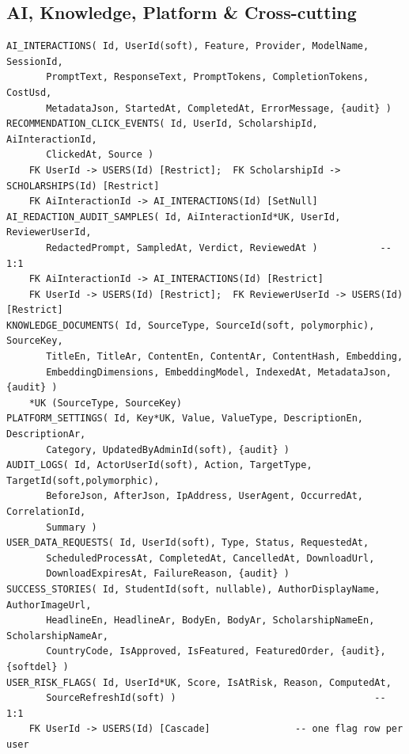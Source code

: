 \documentclass[11pt,a4paper]{article}
\begin{document}
\subsection{AI, Knowledge, Platform \& Cross-cutting}
{\footnotesize\begin{verbatim}
AI_INTERACTIONS( Id, UserId(soft), Feature, Provider, ModelName, SessionId,
       PromptText, ResponseText, PromptTokens, CompletionTokens, CostUsd,
       MetadataJson, StartedAt, CompletedAt, ErrorMessage, {audit} )
RECOMMENDATION_CLICK_EVENTS( Id, UserId, ScholarshipId, AiInteractionId,
       ClickedAt, Source )
    FK UserId -> USERS(Id) [Restrict];  FK ScholarshipId -> SCHOLARSHIPS(Id) [Restrict]
    FK AiInteractionId -> AI_INTERACTIONS(Id) [SetNull]
AI_REDACTION_AUDIT_SAMPLES( Id, AiInteractionId*UK, UserId, ReviewerUserId,
       RedactedPrompt, SampledAt, Verdict, ReviewedAt )           -- 1:1
    FK AiInteractionId -> AI_INTERACTIONS(Id) [Restrict]
    FK UserId -> USERS(Id) [Restrict];  FK ReviewerUserId -> USERS(Id) [Restrict]
KNOWLEDGE_DOCUMENTS( Id, SourceType, SourceId(soft, polymorphic), SourceKey,
       TitleEn, TitleAr, ContentEn, ContentAr, ContentHash, Embedding,
       EmbeddingDimensions, EmbeddingModel, IndexedAt, MetadataJson, {audit} )
    *UK (SourceType, SourceKey)
PLATFORM_SETTINGS( Id, Key*UK, Value, ValueType, DescriptionEn, DescriptionAr,
       Category, UpdatedByAdminId(soft), {audit} )
AUDIT_LOGS( Id, ActorUserId(soft), Action, TargetType, TargetId(soft,polymorphic),
       BeforeJson, AfterJson, IpAddress, UserAgent, OccurredAt, CorrelationId,
       Summary )
USER_DATA_REQUESTS( Id, UserId(soft), Type, Status, RequestedAt,
       ScheduledProcessAt, CompletedAt, CancelledAt, DownloadUrl,
       DownloadExpiresAt, FailureReason, {audit} )
SUCCESS_STORIES( Id, StudentId(soft, nullable), AuthorDisplayName, AuthorImageUrl,
       HeadlineEn, HeadlineAr, BodyEn, BodyAr, ScholarshipNameEn, ScholarshipNameAr,
       CountryCode, IsApproved, IsFeatured, FeaturedOrder, {audit}, {softdel} )
USER_RISK_FLAGS( Id, UserId*UK, Score, IsAtRisk, Reason, ComputedAt,
       SourceRefreshId(soft) )                                   -- 1:1
    FK UserId -> USERS(Id) [Cascade]               -- one flag row per user
\end{verbatim}}
\end{document}
